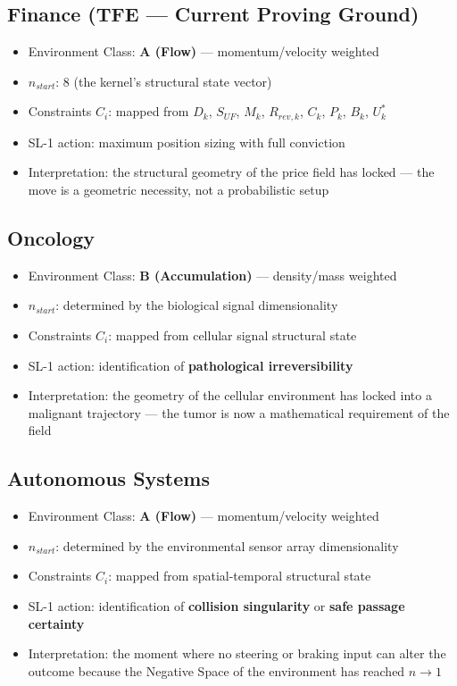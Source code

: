 \documentclass[11pt, a4paper]{article}
\begin{document}
\subsection{Finance (TFE --- Current Proving Ground)}

\begin{itemize}[nosep]
  \item Environment Class: \textbf{A (Flow)} --- momentum/velocity weighted
  \item $n_{start}$: 8 (the kernel's structural state vector)
  \item Constraints $C_i$: mapped from $D_k$, $S_{UF}$, $M_k$, $R_{rev,k}$,
        $C_k$, $P_k$, $B_k$, $U^*_k$
  \item SL-1 action: maximum position sizing with full conviction
  \item Interpretation: the structural geometry of the price field has
        locked --- the move is a geometric necessity, not a probabilistic setup
\end{itemize}

\subsection{Oncology}

\begin{itemize}[nosep]
  \item Environment Class: \textbf{B (Accumulation)} --- density/mass weighted
  \item $n_{start}$: determined by the biological signal dimensionality
  \item Constraints $C_i$: mapped from cellular signal structural state
  \item SL-1 action: identification of \textbf{pathological irreversibility}
  \item Interpretation: the geometry of the cellular environment has locked
        into a malignant trajectory --- the tumor is now a mathematical
        requirement of the field
\end{itemize}

\subsection{Autonomous Systems}

\begin{itemize}[nosep]
  \item Environment Class: \textbf{A (Flow)} --- momentum/velocity weighted
  \item $n_{start}$: determined by the environmental sensor array dimensionality
  \item Constraints $C_i$: mapped from spatial-temporal structural state
  \item SL-1 action: identification of \textbf{collision singularity} or
        \textbf{safe passage certainty}
  \item Interpretation: the moment where no steering or braking input can
        alter the outcome because the Negative Space of the environment
        has reached $n \to 1$
\end{itemize}
\end{document}
